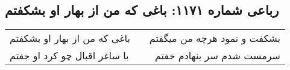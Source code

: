 \begin{center}
\section*{رباعی شماره ۱۱۷۱: باغی که من از بهار او بشکفتم}
\label{sec:1171}
\begin{longtable}{l p{0.5cm} r}
باغی که من از بهار او بشکفتم
&&
بشکفت و نمود هرچه من میگفتم
\\
با ساغر اقبال چو کرد او جفتم
&&
سرمست شدم سر بنهادم خفتم
\\
\end{longtable}
\end{center}
